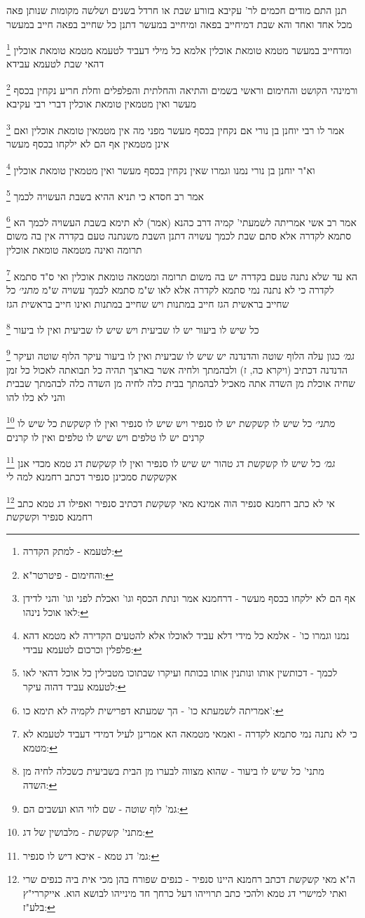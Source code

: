 \documentclass[12pt, openany]{book}
\newcommand{\footnotecomment}[1]{
	\renewcommand\thefootnote{}
	\footnote{#1}}
\newcommand{\commenta}[1]{\footnotecomment{#1}}
\begin{document}
{{תנן התם מודים חכמים לר' עקיבא בזורע שבת או חרדל בשנים ושלשה מקומות שנותן פאה מכל אחד ואחד
והא שבת דמיחייב בפאה ומיחייב במעשר דתנן כל שחייב בפאה חייב במעשר 
\commenta{לטעמא - למתק הקדרה:}
ומדחייב במעשר מטמא טומאת אוכלין אלמא כל מילי דעביד לטעמא מטמא טומאת אוכלין דהאי שבת לטעמא עבידא 
\commenta{והחימום - פיטרטר"א:}
ורמינהי הקושט והחימום וראשי בשמים והתיאה והחלתית והפלפלים וחלת חריע נקחין בכסף מעשר ואין מטמאין טומאת אוכלין דברי רבי עקיבא 
\commenta{אף הם לא ילקחו בכסף מעשר - דרחמנא אמר ונתת הכסף וגו' ואכלת לפני וגו' והני לדידן לאו אוכל נינהו:}
אמר לו רבי יוחנן בן נורי אם נקחין בכסף מעשר מפני מה אין מטמאין טומאת אוכלין ואם אינן מטמאין אף הם לא ילקחו בכסף מעשר 
\commenta{נמנו וגמרו כו' - אלמא כל מידי דלא עביד לאוכלו אלא להטעים הקדירה לא מטמא דהא פלפלין וכרכום לטעמא עבידי:}
וא"ר יוחנן בן נורי נמנו וגמרו שאין נקחין בכסף מעשר ואין מטמאין טומאת אוכלין 
\commenta{לכמך - דכותשין אותו ונותנין אותו בכותח ועיקרו שבתוכו מטבילין כל אוכל דהאי לאו לטעמא עביד דהוה עיקר:}
אמר רב חסדא כי תניא ההיא בשבת העשויה לכמך 
\commenta{אמריתה לשמעתא כו' - הך שמעתא דפרישית לקמיה לא תימא כו':}
אמר רב אשי אמריתה לשמעתי' קמיה דרב כהנא (אמר) לא תימא בשבת העשויה לכמך הא סתמא לקדרה אלא סתם שבת לכמך עשויה דתנן השבת משנתנה טעם בקדרה אין בה משום תרומה ואינה מטמאה טומאת אוכלין 
\commenta{כי לא נתנה נמי סתמא לקדרה - ואמאי מטמאה הא אמרינן לעיל דמידי דעביד לטעמא לא מטמא:}
הא עד שלא נתנה טעם בקדרה יש בה משום תרומה ומטמאה טומאת אוכלין ואי ס"ד סתמא לקדרה כי לא נתנה נמי סתמא לקדרה אלא לאו ש"מ סתמא לכמך עשויה ש"מ
{\large\emph{מתני׳}} כל שחייב בראשית הגז חייב במתנות ויש שחייב במתנות ואינו חייב בראשית הגז
\commenta{מתני' כל שיש לו ביעור - שהוא מצווה לבערו מן הבית בשביעית כשכלה לחיה מן השדה:}
כל שיש לו ביעור יש לו שביעית ויש שיש לו שביעית ואין לו ביעור
\commenta{גמ' לוף שוטה - שם לווי הוא ועשבים הם:}
{\large\emph{גמ׳}} כגון עלה הלוף שוטה והדנדנה יש שיש לו שביעית ואין לו ביעור עיקר הלוף שוטה ועיקר הדנדנה
דכתיב (ויקרא כה, ז) ולבהמתך ולחיה אשר בארצך תהיה כל תבואתה לאכול כל זמן שחיה אוכלת מן השדה אתה מאכיל לבהמתך בבית כלה לחיה מן השדה כלה לבהמתך שבבית והני לא כלו להו
\commenta{מתני' קשקשת - מלבושין של דג:}
{\large\emph{מתני׳}} כל שיש לו קשקשת יש לו סנפיר ויש שיש לו סנפיר ואין לו קשקשת כל שיש לו קרנים יש לו טלפים ויש שיש לו טלפים ואין לו קרנים
\commenta{גמ' דג טמא - איכא דיש לו סנפיר:}
{\large\emph{גמ׳}} כל שיש לו קשקשת דג טהור יש שיש לו סנפיר ואין לו קשקשת דג טמא מכדי אנן אקשקשת סמכינן סנפיר דכתב רחמנא למה לי 
\commenta{ה"א מאי קשקשת דכתב רחמנא היינו סנפיר - כנפים שפורח בהן מכי אית ביה כנפים שרי ואתי למישרי דג טמא ולהכי כתב תרוייהו דעל כרחך חד מינייהו לבושא הוא. אייקררי"ץ בלע"ז:}
אי לא כתב רחמנא סנפיר הוה אמינא מאי קשקשת דכתיב סנפיר ואפילו דג טמא כתב רחמנא סנפיר וקשקשת 
}}
\end{document}
